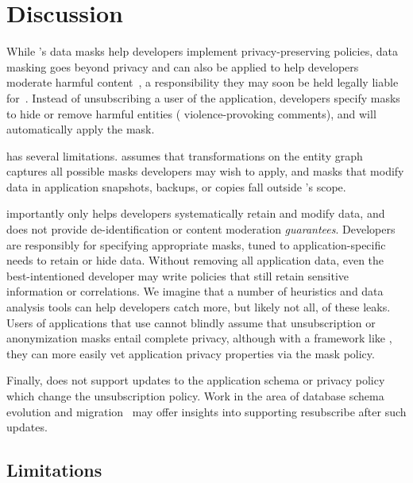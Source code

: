 \section{Discussion}
While \name's data masks help developers implement privacy-preserving policies, data masking goes
beyond privacy and can also be applied to help developers moderate harmful content~\cite{contentmod,
sasb}, a responsibility they may soon be held legally liable for~\cite{nytimes:230}. Instead of
unsubscribing a user of the application, developers specify masks to hide or remove harmful entities (\eg
violence-provoking comments), and \name will automatically apply the mask.

\name has several limitations. \name assumes that transformations on the entity graph captures all possible masks developers may
wish to apply, and masks that modify data in application snapshots, backups, or copies fall outside
\name's scope.

\name importantly only helps developers systematically retain and modify data, and does not provide
de-identification or content moderation \emph{guarantees}. Developers are responsibly for specifying
appropriate masks, tuned to application-specific needs to retain or hide data. Without removing all
application data, even the best-intentioned developer may write policies that still retain
sensitive information or correlations. We imagine that a number of heuristics and data analysis
tools can help developers catch more, but likely not all, of these leaks. Users of applications that
use \sys cannot blindly assume that unsubscription or anonymization masks entail complete privacy,
although with a framework like \sys, they can more easily vet application privacy properties via the  
mask policy.

Finally, \sys does not support updates to the application schema or privacy policy which change the
unsubscription policy.
Work in the area of database schema evolution and migration~\cite{schema:evo} may offer insights
into supporting resubscribe after such updates.

\iffalse
\subsection{Limitations}

